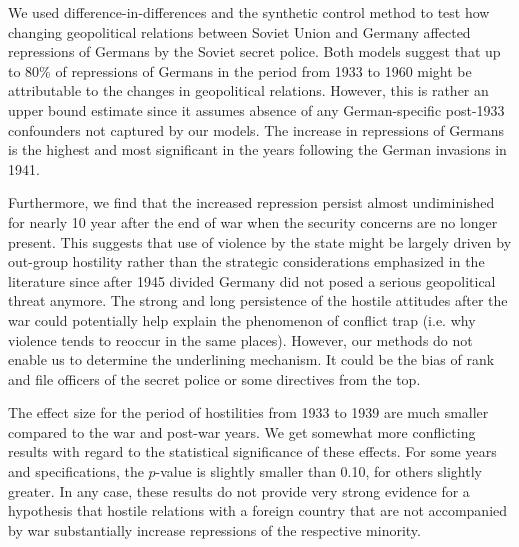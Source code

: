 We used difference-in-differences and the synthetic control method to test how changing geopolitical relations between Soviet Union and Germany  affected repressions of Germans by the Soviet secret police. 
Both models suggest that up to 80\% of  repressions of Germans in the period from 1933 to 1960 might be attributable to the changes in geopolitical relations. 
However, this is rather an upper bound estimate since it assumes absence of any German-specific  post-1933 confounders not captured by our models. 
The increase in repressions of Germans is the highest and most significant in the years following the German invasions in 1941. 


Furthermore, we find that the increased repression persist almost undiminished for nearly 10 year after the end of war when the security concerns are no longer present.
This  suggests that use of violence by the state might be largely driven by out-group 
hostility rather than the strategic considerations emphasized in the literature since after 1945 divided Germany did not posed a serious geopolitical threat anymore. 
The strong and long persistence of the hostile attitudes after the war could potentially help explain the phenomenon of conflict trap (i.e. why violence tends to reoccur in the same places). 
However, our methods do not enable us to determine the underlining mechanism. It could be the bias of  rank and file officers of the secret police or some  directives from the top. %

The effect size for the period of hostilities from 1933 to 1939 are much smaller compared to the war and post-war years. 
We get somewhat more conflicting results with regard to the statistical significance of these effects. 
For some years and specifications, the $p$-value is slightly smaller than 0.10, for others slightly greater. 
In any case, these results do not provide very strong evidence for a hypothesis that hostile  relations with a foreign country that are not accompanied by war substantially increase repressions of the respective minority. 


